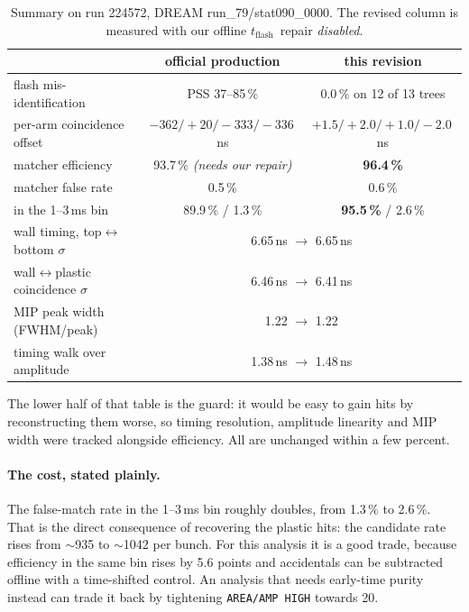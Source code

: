 \documentclass[11pt,a4paper]{article}
\newcommand{\tf}{$t_{\mathrm{flash}}$}
\begin{document}
\begin{table}[htbp]\centering\small
\caption{Summary on run 224572, DREAM run\_79/stat090\_0000. The revised column
is measured with our offline \tf\ repair \emph{disabled}.}
\begin{tabular}{lcc}
\toprule
 & official production & this revision \\
\midrule
flash mis-identification & PSS 37--85\,\% & 0.0\,\% on 12 of 13 trees \\
per-arm coincidence offset & $-362/{+}20/{-}333/{-}336$\,ns & $+1.5/{+}2.0/{+}1.0/{-}2.0$\,ns \\
matcher efficiency & 93.7\,\% \emph{(needs our repair)} & \textbf{96.4\,\%} \\
matcher false rate & 0.5\,\% & 0.6\,\% \\
\quad in the 1--3\,ms bin & 89.9\,\% / 1.3\,\% & \textbf{95.5\,\%} / 2.6\,\% \\
\midrule
wall timing, top$\leftrightarrow$bottom $\sigma$ & \multicolumn{2}{c}{6.65\,ns $\rightarrow$ 6.65\,ns} \\
wall$\leftrightarrow$plastic coincidence $\sigma$ & \multicolumn{2}{c}{6.46\,ns $\rightarrow$ 6.41\,ns} \\
MIP peak width (FWHM/peak) & \multicolumn{2}{c}{1.22 $\rightarrow$ 1.22} \\
timing walk over amplitude & \multicolumn{2}{c}{1.38\,ns $\rightarrow$ 1.48\,ns} \\
\bottomrule
\end{tabular}
\end{table}

The lower half of that table is the guard: it would be easy to gain hits by
reconstructing them worse, so timing resolution, amplitude linearity and MIP
width were tracked alongside efficiency. All are unchanged within a few
percent.

\paragraph{The cost, stated plainly.} The false-match rate in the 1--3\,ms bin
roughly doubles, from 1.3\,\% to 2.6\,\%. That is the direct consequence of
recovering the plastic hits: the candidate rate rises from $\sim$935 to
$\sim$1042 per bunch. For this analysis it is a good trade, because efficiency
in the same bin rises by 5.6 points and accidentals can be subtracted offline
with a time-shifted control. An analysis that needs early-time purity instead
can trade it back by tightening \texttt{AREA/AMP HIGH} towards 20.
\end{document}
